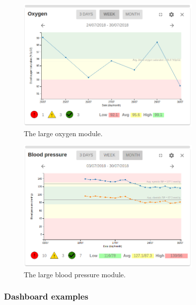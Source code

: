     \begin{figure}[!htb]
        \centering
        \includegraphics[width=0.8\textwidth]{screenshots/oxygen_large}
        \caption{The large oxygen module.}\label{fig:screen_oxygen_large}
    \end{figure}

    \begin{figure}[!htb]
        \centering
        \includegraphics[width=0.8\textwidth]{screenshots/bp_large_month}
        \caption{The large blood pressure module.}\label{fig:screen_bp_large_month}
    \end{figure}

    \clearpage
    \subsubsection{Dashboard examples}

